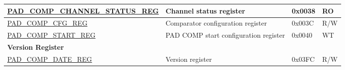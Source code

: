\begin{longtable}{ | p{6cm} | p{6.8cm} | p{1.3cm} | p{1.4cm} | }
\hyperref[regdesc:PADCOMPCHANNELSTATUSREG]{PAD\_COMP\_CHANNEL\_STATUS\_REG} & Channel status register & 0x0038 & RO \\ \hline
\hyperref[regdesc:PADCOMPCFGREG]{PAD\_COMP\_CFG\_REG} & Comparator configuration register & 0x003C & R/W \\ \hline
\hyperref[regdesc:PADCOMPSTARTREG]{PAD\_COMP\_START\_REG} & PAD COMP start configuration register & 0x0040 & WT \\ \hline
\multicolumn{4}{|l|}{\textbf{Version Register}} \\ \hline
\hyperref[regdesc:PADCOMPDATEREG]{PAD\_COMP\_DATE\_REG} & Version register & 0x03FC & R/W \\ \hline
\end{longtable}
